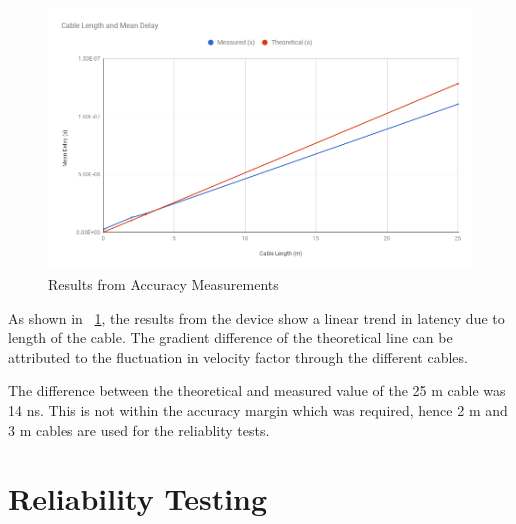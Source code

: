 \begin{figure}[H]
    \begin{center}
        \includegraphics[keepaspectratio,width=15cm]{Images/CableTesting}
        \caption{Results from Accuracy Measurements}
        \label{fig:accuracyMeasurements}
    \end{center}
\end{figure}

\par As shown in ~\ref{fig:accuracyMeasurements}, the results from the device show a linear trend in latency due to 
length of the cable. The gradient difference of the theoretical line can be attributed to the fluctuation in 
velocity factor through the different cables.

\par The difference between the theoretical and measured value of the 25 m cable was 14 ns. This is not within the 
accuracy margin which was required, hence 2 m and 3 m cables are used for the reliablity tests.

\section{Reliability Testing}
